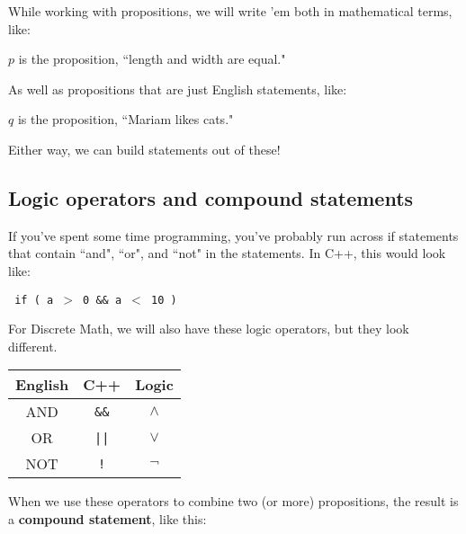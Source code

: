 \documentclass[../RachelNotes.tex]{subfiles}
\begin{document}
        While working with propositions, we will write 'em both in
        mathematical terms, like:

        \begin{center} $p$ is the proposition, ``length and width are equal." \end{center}

        As well as propositions that are just English statements, like:

        \begin{center} $q$ is the proposition, ``Mariam likes cats." \end{center}

        Either way, we can build statements out of these!



        \subsection{Logic operators and compound statements}

        If you've spent some time programming, you've probably run across
        if statements that contain ``and", ``or", and ``not" in the statements.
        In C++, this would look like:

        \begin{center}
        \texttt{
        if ( a $>$ 0 \&\& a $<$ 10 )
        }
        \end{center}

        For Discrete Math, we will also have these logic operators, but
        they look different.

        \begin{center}
            \begin{tabular}{ c c c }
                \textbf{English} & \textbf{C++} & \textbf{Logic}
                \\ \hline
                AND & \texttt{\&\&} & $\land$
                \\
                OR & \texttt{||} & $\lor$
                \\
                NOT & \texttt{!} & $\neg$
            \end{tabular}
        \end{center}

        When we use these operators to combine two (or more) propositions,
        the result is a \textbf{compound statement}, like this: 
\end{document}

